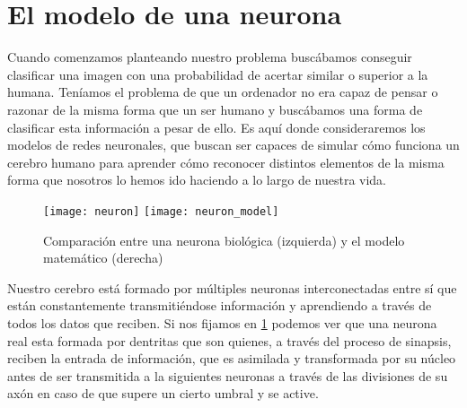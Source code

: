 \section{El modelo de una neurona}

Cuando comenzamos planteando nuestro problema buscábamos conseguir clasificar una imagen con una probabilidad de acertar similar o superior a la humana. Teníamos el problema de que un ordenador no era capaz de pensar o razonar de la misma forma que un ser humano y buscábamos una forma de clasificar esta información a pesar de ello. Es aquí donde consideraremos los modelos de redes neuronales, que buscan ser capaces de simular cómo funciona un cerebro humano para aprender cómo reconocer distintos elementos de la misma forma que nosotros lo hemos ido haciendo a lo largo de nuestra vida. %

\begin{figure}[htpb]
  \centering
  \texttt{[image: neuron]}
  \vrule
  \texttt{[image: neuron\_model]}
  \caption{Comparación entre una neurona biológica (izquierda) y el modelo matemático (derecha) \cite{stanford} }
  \label{fig:neurona}
\end{figure}

Nuestro cerebro está formado por múltiples neuronas interconectadas entre sí que están constantemente transmitiéndose información y aprendiendo a través de todos los datos que reciben. Si nos fijamos en \ref{fig:neurona} podemos ver que una neurona real esta formada por dentritas que son quienes, a través del proceso de sinapsis, reciben la entrada de información, que es asimilada y transformada por su núcleo antes de ser transmitida a la siguientes neuronas a través de las divisiones de su axón en caso de que supere un cierto umbral y se active.\newline

